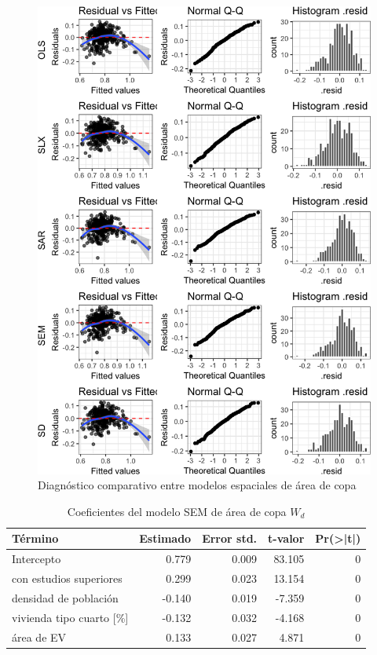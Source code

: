 \documentclass[12pt,a4paper,oneside, openany]{book}
\theoremstyle{definition}
\theoremstyle{definition}
\theoremstyle{definition}
\theoremstyle{remark}
\begin{document}
\begin{figure}[H]

{\centering \includegraphics[width=1\linewidth]{tesis-unigis_files/figure-latex/diag-model-espaciales-1} 

}

\caption{Diagnóstico comparativo entre modelos espaciales de área de copa}\label{fig:diag-model-espaciales}
\end{figure}

\begin{table}[H]

\caption{\label{tab:coef-sem-copa-wd}Coeficientes del modelo SEM de área de copa $W_d$}
\centering
\begin{tabular}{lrrrr}
\toprule
Término & Estimado & Error std. & t-valor & Pr(>|t|)\\
\midrule
Intercepto & 0.779 & 0.009 & 83.105 & 0\\
con estudios superiores & 0.299 & 0.023 & 13.154 & 0\\
densidad de población & -0.140 & 0.019 & -7.359 & 0\\
vivienda tipo cuarto [\%] & -0.132 & 0.032 & -4.168 & 0\\
área de EV & 0.133 & 0.027 & 4.871 & 0\\
\bottomrule
\end{tabular}
\end{table}
\end{document}
